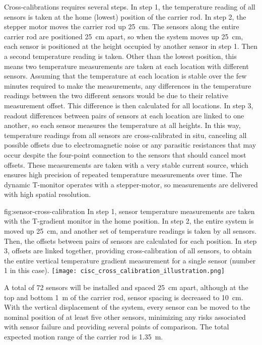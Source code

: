 Cross-calibrations requires several steps. In step 1, the temperature reading  of all sensors is taken at the home (lowest) position of the carrier rod. In  step 2, the stepper motor moves the carrier rod up \SI{25}{cm}. The sensors along the entire  carrier rod are positioned \SI{25}{cm} apart, so when the system moves up \SI{25}{cm}, each sensor is positioned at the height occupied by another sensor in step 1. Then a second temperature reading is taken. Other than the lowest position, this means two temperature measurements are taken at each location with %
different sensors. Assuming that the temperature at each location is stable over the few minutes required to make the measurements, %
any differences in the temperature readings between the two different sensors would be due to their relative measurement offset. This %
difference is then calculated for all locations.  In step 3, readout differences between pairs of sensors at each location are linked to one another, so each sensor measures the temperature at all heights. In this way, temperature readings from all sensors are cross-calibrated %
in situ, canceling all possible offsets due to electromagnetic noise or any parasitic resistances that may occur despite the four-point connection to the sensors that should cancel most offsets. These measurements are taken with a very stable current source, which ensures high precision of repeated temperature measurements over time. The dynamic T-monitor operates with a stepper-motor, so measurements are delivered with high spatial resolution. 

\begin{dunefigure}{fig:sensor-cross-calibration}
  {In step 1, sensor temperature measurements are taken with the T-gradient monitor in the home position. In step 2, the entire system is moved up \SI{25}{cm}, and another set of temperature readings is taken by all sensors. Then, the offsets between pairs of sensors are calculated for each position. In step 3, offsets are linked together, providing cross-calibration of all sensors, to obtain the entire vertical temperature gradient measurement for a single sensor (number 1 in this case). }
  \texttt{[image: cisc\_cross\_calibration\_illustration.png]}%
\end{dunefigure}


A total of \num{72} sensors will be installed and spaced \SI{25}{cm} apart, although at the top and bottom \SI{1}{m} of the carrier rod, sensor spacing is decreased to \SI{10}{cm}.  
 With the vertical displacement of the system, every sensor can be moved to the nominal position of at least five other sensors, minimizing any risks associated with sensor failure and providing several points of comparison. The total expected motion range of the carrier rod is \SI{1.35}{m}.


